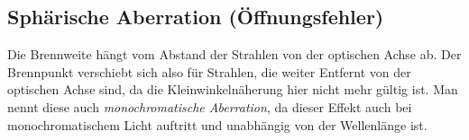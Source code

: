 \subsection{Sphärische Aberration (Öffnungsfehler)}
Die Brennweite hängt vom Abstand der Strahlen von der optischen Achse ab. Der Brennpunkt verschiebt sich also für Strahlen, die weiter Entfernt von der optischen Achse sind, da die Kleinwinkelnäherung hier nicht mehr gültig ist.
Man nennt diese auch \emph{monochromatische Aberration}, da dieser Effekt auch bei monochromatischem Licht auftritt und unabhängig von der Wellenlänge ist.


